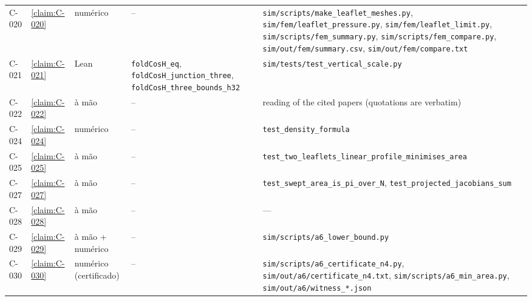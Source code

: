 \begin{longtable}{@{}l>{\raggedright}p{}>{\raggedright}p{}>{\raggedright}p{}>{\raggedright\arraybackslash}p{}@{}}
C-020 & \cref{claim:C-020} & numérico & -- & \texttt{sim/\allowbreak{}scripts/\allowbreak{}make\_\allowbreak{}leaflet\_\allowbreak{}meshes.\allowbreak{}py}, \texttt{sim/\allowbreak{}fem/\allowbreak{}leaflet\_\allowbreak{}pressure.\allowbreak{}py}, \texttt{sim/\allowbreak{}fem/\allowbreak{}leaflet\_\allowbreak{}limit.\allowbreak{}py}, \texttt{sim/\allowbreak{}scripts/\allowbreak{}fem\_\allowbreak{}summary.\allowbreak{}py}, \texttt{sim/\allowbreak{}scripts/\allowbreak{}fem\_\allowbreak{}compare.\allowbreak{}py}, \texttt{sim/\allowbreak{}out/\allowbreak{}fem/\allowbreak{}summary.\allowbreak{}csv}, \texttt{sim/\allowbreak{}out/\allowbreak{}fem/\allowbreak{}compare.\allowbreak{}txt}\\
C-021 & \cref{claim:C-021} & Lean & \texttt{foldCosH\_\allowbreak{}eq}, \texttt{foldCosH\_\allowbreak{}junction\_\allowbreak{}three}, \texttt{foldCosH\_\allowbreak{}three\_\allowbreak{}bounds\_\allowbreak{}h32} & \texttt{sim/\allowbreak{}tests/\allowbreak{}test\_\allowbreak{}vertical\_\allowbreak{}scale.\allowbreak{}py}\\
C-022 & \cref{claim:C-022} & à mão & -- & reading of the cited papers (quotations are verbatim)\\
C-024 & \cref{claim:C-024} & numérico & -- & \texttt{test\_\allowbreak{}density\_\allowbreak{}formula}\\
C-025 & \cref{claim:C-025} & à mão & -- & \texttt{test\_\allowbreak{}two\_\allowbreak{}leaflets\_\allowbreak{}linear\_\allowbreak{}profile\_\allowbreak{}minimises\_\allowbreak{}area}\\
C-027 & \cref{claim:C-027} & à mão & -- & \texttt{test\_\allowbreak{}swept\_\allowbreak{}area\_\allowbreak{}is\_\allowbreak{}pi\_\allowbreak{}over\_\allowbreak{}N}, \texttt{test\_\allowbreak{}projected\_\allowbreak{}jacobians\_\allowbreak{}sum}\\
C-028 & \cref{claim:C-028} & à mão & -- & —\\
C-029 & \cref{claim:C-029} & à mão + numérico & -- & \texttt{sim/\allowbreak{}scripts/\allowbreak{}a6\_\allowbreak{}lower\_\allowbreak{}bound.\allowbreak{}py}\\
C-030 & \cref{claim:C-030} & numérico (certificado) & -- & \texttt{sim/\allowbreak{}scripts/\allowbreak{}a6\_\allowbreak{}certificate\_\allowbreak{}n4.\allowbreak{}py}, \texttt{sim/\allowbreak{}out/\allowbreak{}a6/\allowbreak{}certificate\_\allowbreak{}n4.\allowbreak{}txt}, \texttt{sim/\allowbreak{}scripts/\allowbreak{}a6\_\allowbreak{}min\_\allowbreak{}area.\allowbreak{}py}, \texttt{sim/\allowbreak{}out/\allowbreak{}a6/\allowbreak{}witness\_\allowbreak{}*.\allowbreak{}json}\\

\end{longtable}
